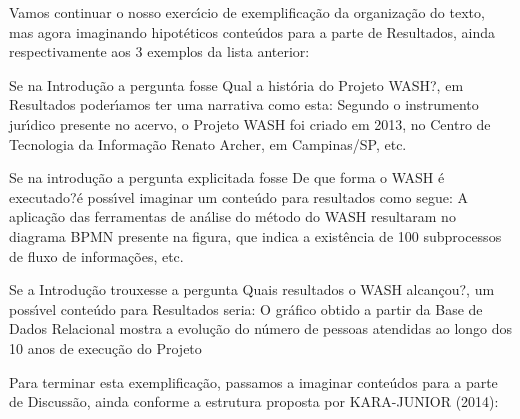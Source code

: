 \documentclass[
12pt,		%
openright,	%
twoside,  %
a4paper,			%
chapter=TITLE,		%
english,			%
french,				%
spanish,			%
brazil				%
]{USPSC-classe/USPSC_RedarTex}
\begin{document}
Vamos continuar o nosso exerc\'{\i}cio de exemplifica\c{c}\~ao da organiza\c{c}\~ao do texto, mas agora imaginando hipot\'eticos conte\'udos para a parte de Resultados, ainda respectivamente aos 3 exemplos da lista anterior:











\begin{alineas}
\item Se na Introdu\c{c}\~ao a pergunta fosse \textquotedbl Qual a hist\'oria do Projeto WASH?\textquotedbl , em Resultados poder\'{\i}amos ter uma narrativa como esta: \textquotedbl Segundo o instrumento jur\'{\i}dico presente no acervo, o Projeto WASH foi criado em 2013, no Centro de Tecnologia da Informa\c{c}\~ao Renato Archer, em Campinas/SP, etc.\textquotedbl 
\item Se na introdu\c{c}\~ao a pergunta explicitada fosse \textquotedbl De que forma o WASH \'e executado?\textquotedbl  \'e poss\'{\i}vel imaginar um conte\'udo para resultados como segue: \textquotedbl A aplica\c{c}\~ao das ferramentas de an\'alise do m\'etodo do WASH resultaram no diagrama BPMN presente na figura, que indica a exist\^encia de 100 subprocessos de fluxo de informa\c{c}\~oes, etc.\textquotedbl 
\item Se a Introdu\c{c}\~ao trouxesse a pergunta \textquotedbl Quais resultados o WASH alcan\c{c}ou?\textquotedbl , um poss\'{\i}vel conte\'udo para Resultados seria: \textquotedbl O gr\'afico obtido a partir da Base de Dados Relacional mostra a evolu\c{c}\~ao do n\'umero de pessoas atendidas ao longo dos 10 anos de execu\c{c}\~ao do Projeto\textquotedbl 
\end{alineas}

Para terminar esta exemplifica\c{c}\~ao, passamos a imaginar conte\'udos para a parte de Discuss\~ao, ainda conforme a estrutura proposta por  KARA-JUNIOR (2014):
\end{document}
